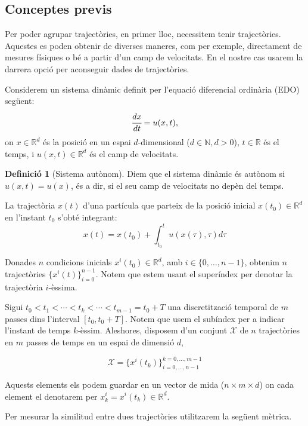 \documentclass[12,twoside]{TFG-GM}
\theoremstyle{definition}
\newtheorem{definition}[theorem]{Definició}
\theoremstyle{remark}
\newcommand{\N}{\mathbb{N}}
\newcommand{\R}{\mathbb{R}}
\begin{document}
\subsection{Conceptes previs}

Per poder agrupar trajectòries, en primer lloc, necessitem tenir trajectòries. Aquestes es poden obtenir de diverses maneres, com per exemple, directament de mesures físiques o bé a partir d'un camp de velocitats. En el nostre cas usarem la darrera opció per aconseguir dades de trajectòries.

Considerem un sistema dinàmic definit per l'equació diferencial ordinària (EDO) següent: $$\cfrac{dx}{dt} = u(x, t),$$ on $x\in\R^d$ és la posició en un espai $d$-dimensional ($d\in\N,d>0$), $t\in\R$ és el temps, i $u(x, t)\in\R^d$ és el camp de velocitats. 

\begin{definition}[Sistema autònom]
Diem que el sistema dinàmic és autònom si $u(x,t)=u(x)$, és a dir, si el seu camp de velocitats no depèn del temps.
\end{definition}

La trajectòria $x(t)$ d'una partícula que parteix de la posició inicial $x(t_0)\in\R^d$ en l'instant $t_0$ s'obté integrant:
\begin{equation}
    x(t) = x(t_0) + \int_{t_0}^{t} u(x(\tau), \tau) d\tau
\end{equation}

Donades $n$ condicions inicials $x^i(t_0)\in\R^d$, amb $i\in\{0,\dots,n-1\}$, obtenim $n$ trajectòries $\{x^i(t)\}_{i=0}^{n-1}$. Notem que estem usant el superíndex per denotar la trajectòria $i$-èssima.

Sigui $t_0 < t_1 < \cdots < t_{k} < \cdots < t_{m-1} = t_0 + T$ una discretització temporal de $m$ passes dins l'interval $[t_0, t_0 + T]$. Notem que usem el subíndex per a indicar l'instant de temps $k$-èssim. Aleshores, disposem d'un conjunt $\mathcal{X}$ de $n$ trajectòries en $m$ passes de temps en un espai de dimensió $d$, 

\begin{equation} \label{eq:conjunt_dades}
    \mathcal{X} = \{ x^i(t_k) \}_{i=0, \dots, n-1}^{k=0, \dots, m-1}
\end{equation}

Aquests elements els podem guardar en un vector de mida ($n\times m \times d$) on cada element el denotarem per $x^i_k=x^i(t_k)\in\R^d$.

Per mesurar la similitud entre dues trajectòries utilitzarem la següent mètrica.
\end{document}

